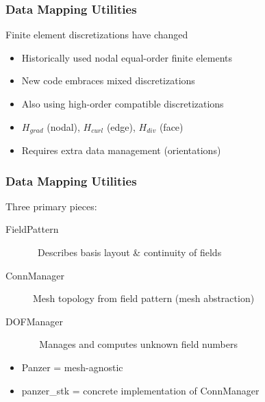 \documentclass{beamer}
\begin{document}
  \begin{frame}
    \frametitle{Data Mapping Utilities}
    Finite element discretizations have changed
    \begin{itemize}
      \item Historically used nodal equal-order finite elements
      \item New code embraces mixed discretizations
      \item Also using high-order compatible discretizations
      \item \textcolor{red!80!black}{$H_{grad}$} (nodal), \textcolor{green!80!black}{$H_{curl}$} (edge), \textcolor{blue!80!black}{$H_{div}$} (face)
      \item Requires extra data management (orientations)
    \end{itemize}
    \begin{figure}
    \end{figure}
  \end{frame}

  \begin{frame}
    \frametitle{Data Mapping Utilities}
    Three primary pieces:\\
    \begin{description}
      \item[FieldPattern\ \ \ ]  \ Describes basis layout \& continuity of
                                 fields
      \item[ConnManager]         Mesh topology from field pattern (mesh
                                 abstraction)
      \item[DOFManager]          \ \,Manages and computes unknown field numbers
    \end{description}
    \begin{itemize}
      \item \alert{Panzer = mesh-agnostic}
      \item panzer\_stk = concrete implementation of ConnManager
    \end{itemize}
  \end{frame}
\end{document}
